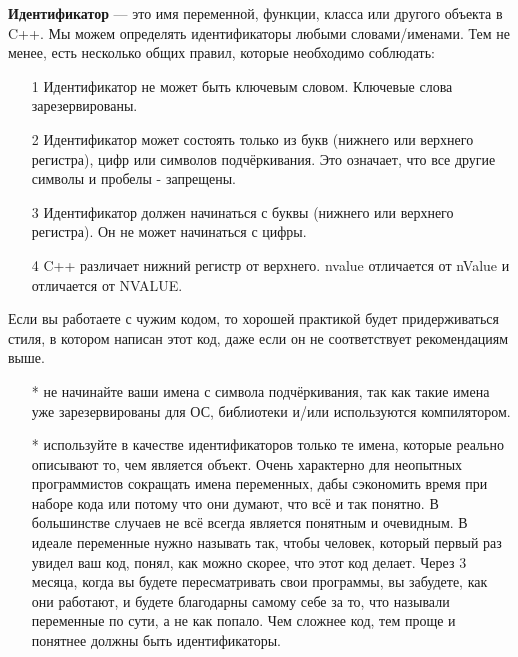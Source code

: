\documentclass[a4paper,16pt]{report} %
\begin{document}
\textbf{Идентификатор} — это имя переменной, функции, класса или другого объекта в C++. Мы можем определять идентификаторы любыми словами/именами. Тем не менее, есть несколько общих правил, которые необходимо соблюдать:
\begin{itemize}
	\item[1]Идентификатор не может быть ключевым словом. Ключевые слова зарезервированы.
	\item[2]Идентификатор может состоять только из букв (нижнего или верхнего регистра), цифр или символов подчёркивания. Это означает, что все другие символы и пробелы - запрещены.
	\item[3]Идентификатор должен начинаться с буквы (нижнего или верхнего регистра). Он не может начинаться с цифры.
	\item[4]C++ различает нижний регистр от верхнего. nvalue отличается от nValue и отличается от NVALUE.
\end{itemize}

Если вы работаете с чужим кодом, то хорошей практикой будет придерживаться стиля, в котором написан этот код, даже если он не соответствует рекомендациям выше.

\begin{itemize}
	\item[*] не начинайте ваши имена с символа подчёркивания, так как такие имена уже зарезервированы для ОС, библиотеки и/или используются компилятором.
	\item[*] используйте в качестве идентификаторов только те имена, которые реально описывают то, чем является объект. Очень характерно для неопытных программистов сокращать имена переменных, дабы сэкономить время при наборе кода или потому что они думают, что всё и так понятно. В большинстве случаев не всё всегда является понятным и очевидным. В идеале переменные нужно называть так, чтобы человек, который первый раз увидел ваш код, понял, как можно скорее, что этот код делает. Через 3 месяца, когда вы будете пересматривать свои программы, вы забудете, как они работают, и будете благодарны самому себе за то, что называли переменные по сути, а не как попало. Чем сложнее код, тем проще и понятнее должны быть идентификаторы.
\end{itemize}
\end{document}

